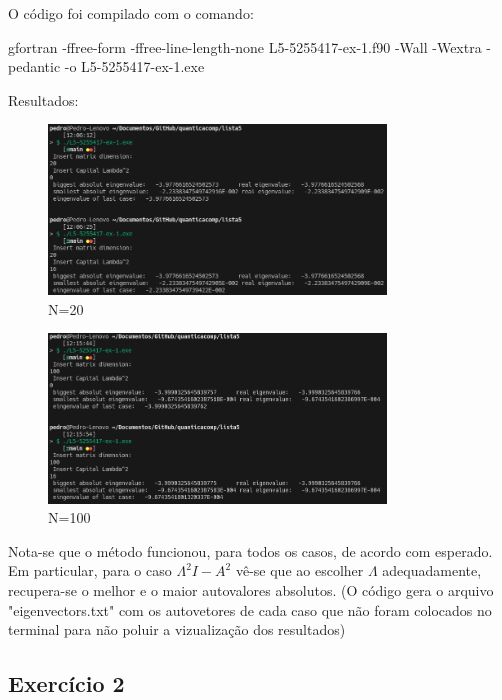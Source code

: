 \documentclass[12pt, a4paper]{article} %
\begin{document}
        O c\'odigo foi compilado com o comando:

gfortran -ffree-form -ffree-line-length-none L5-5255417-ex-1.f90 -Wall -Wextra -pedantic -o L5-5255417-ex-1.exe

        Resultados:

        \begin{figure}[H]
            \centering
            \includegraphics[width=0.8\textwidth]{../images/ex1-20.png}
            \caption{N=20}
        \end{figure}
        \begin{figure}[H]
            \centering
            \includegraphics[width=0.8\textwidth]{../images/ex1-100.png}
            \caption{N=100}
        \end{figure}

        Nota-se que o método funcionou, para todos os casos, de acordo com esperado. Em particular, para o caso $\Lambda^2 I - A^2$ v\^e-se que ao escolher $\Lambda$ adequadamente, recupera-se o melhor e o maior autovalores absolutos.
        (O c\'odigo gera o arquivo "eigenvectors.txt" com os autovetores de cada caso que n\~ao foram colocados no terminal para n\~ao poluir a vizualiza\c{c}\~ao dos resultados)

    \subsection{Exercício 2}
\end{document}
